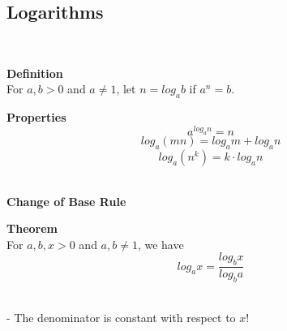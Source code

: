 \documentclass{article}
\begin{document}
\subsection{Logarithms}
\\
\begin{tcolorbox}
    \textbf{Definition} \\
    For $a, b > 0$ and $a \neq 1$, let $n = log_{a}b$ if $a^{n} = b$.
\end{tcolorbox}
\begin{tcolorbox}
    \textbf{Properties} \\
    $$a^{log_{a}n} = n$$
    $$log_{a}(mn) = log_{a}m + log_{a}n$$
    $$log_{a}(n^{k}) = k \cdot log_{a}n$$
\end{tcolorbox}
~\\
\textbf{Change of Base Rule}
\\
\begin{tcolorbox}
    \textbf{Theorem} \\
    For $a, b, x > 0$ and $a, b \neq 1$, we have
    $$log_{a}x = \frac{log_{b}x}{log_{b}a}$$
\end{tcolorbox}
~\\
- The denominator is constant with respect to $x!$ \\
\end{document}
